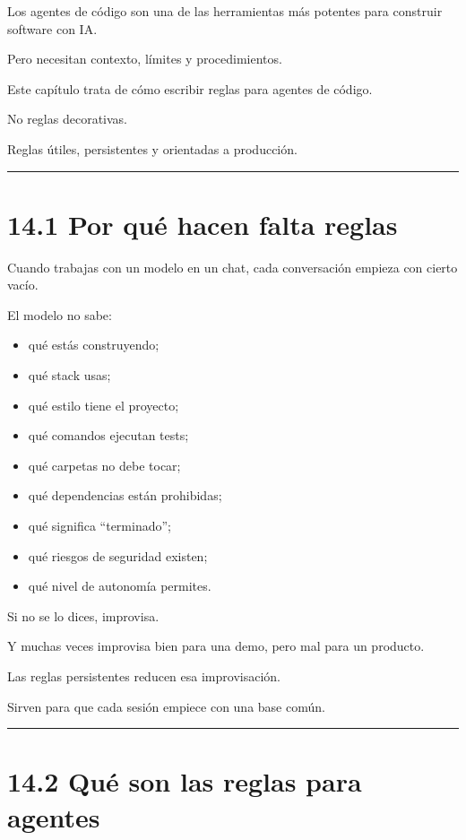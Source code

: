 Los agentes de código son una de las herramientas más potentes para
construir software con IA.

Pero necesitan contexto, límites y procedimientos.

Este capítulo trata de cómo escribir reglas para agentes de código.

No reglas decorativas.

Reglas útiles, persistentes y orientadas a producción.

\begin{center}\rule{0.5\linewidth}{0.5pt}\end{center}

\section{14.1 Por qué hacen falta
reglas}\label{por-quuxe9-hacen-falta-reglas}

Cuando trabajas con un modelo en un chat, cada conversación empieza con
cierto vacío.

El modelo no sabe:

\begin{itemize}
\tightlist
\item
  qué estás construyendo;
\item
  qué stack usas;
\item
  qué estilo tiene el proyecto;
\item
  qué comandos ejecutan tests;
\item
  qué carpetas no debe tocar;
\item
  qué dependencias están prohibidas;
\item
  qué significa ``terminado'';
\item
  qué riesgos de seguridad existen;
\item
  qué nivel de autonomía permites.
\end{itemize}

Si no se lo dices, improvisa.

Y muchas veces improvisa bien para una demo, pero mal para un producto.

Las reglas persistentes reducen esa improvisación.

Sirven para que cada sesión empiece con una base común.

\begin{center}\rule{0.5\linewidth}{0.5pt}\end{center}

\section{14.2 Qué son las reglas para
agentes}\label{quuxe9-son-las-reglas-para-agentes}

